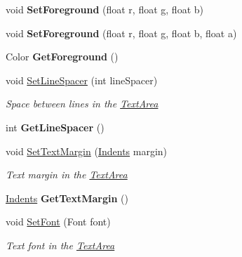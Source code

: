 \begin{DoxyCompactItemize}
void {\bfseries Set\+Foreground} (float r, float g, float b)
\item 
\mbox{\label{class_space_v_i_l_1_1_text_area_ab3321ee3e9c39b2e707739508dde8351}} 
void {\bfseries Set\+Foreground} (float r, float g, float b, float a)
\item 
\mbox{\label{class_space_v_i_l_1_1_text_area_ac2873e2c8712e4658655a4315df651e6}} 
Color {\bfseries Get\+Foreground} ()
\item 
void \mbox{\hyperlink{class_space_v_i_l_1_1_text_area_a133db6e0dc1fccf3e92d4044d9a16df0}{Set\+Line\+Spacer}} (int line\+Spacer)
\begin{DoxyCompactList}\small\item\em Space between lines in the \mbox{\hyperlink{class_space_v_i_l_1_1_text_area}{Text\+Area}} \end{DoxyCompactList}\item 
\mbox{\label{class_space_v_i_l_1_1_text_area_aab5aac2095c6cd6f79d3bde258900bff}} 
int {\bfseries Get\+Line\+Spacer} ()
\item 
void \mbox{\hyperlink{class_space_v_i_l_1_1_text_area_a4c109ddb93c025558a90184754f59de8}{Set\+Text\+Margin}} (\mbox{\hyperlink{struct_space_v_i_l_1_1_decorations_1_1_indents}{Indents}} margin)
\begin{DoxyCompactList}\small\item\em Text margin in the \mbox{\hyperlink{class_space_v_i_l_1_1_text_area}{Text\+Area}} \end{DoxyCompactList}\item 
\mbox{\label{class_space_v_i_l_1_1_text_area_a5a773ffecd327e91ffb821a6780cef82}} 
\mbox{\hyperlink{struct_space_v_i_l_1_1_decorations_1_1_indents}{Indents}} {\bfseries Get\+Text\+Margin} ()
\item 
void \mbox{\hyperlink{class_space_v_i_l_1_1_text_area_ae36fe1442f5315790b8c3a4f2b33287c}{Set\+Font}} (Font font)
\begin{DoxyCompactList}\small\item\em Text font in the \mbox{\hyperlink{class_space_v_i_l_1_1_text_area}{Text\+Area}} \end{DoxyCompactList}\item 
\mbox{\label{class_space_v_i_l_1_1_text_area_aad5e5b0d5f982225a69db1c5397685d2}} 

\end{DoxyCompactItemize}
